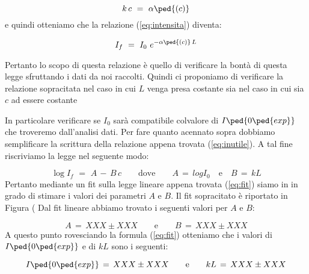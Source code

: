 \begin{equation}
	k\,c \,\,=\,\, \alpha\ped{(c)}
\end{equation}
%
e quindi otteniamo che la relazione (\ref{eq:intensita}) diventa:

\begin{equation}
	I_f \,\,=\,\, I_0 \,\, e^{-\alpha\ped{(c)}\,L}
	\label{eq:inutile}
\end{equation}
%

Pertanto lo scopo di questa relazione è quello di verificare la bontà di questa legge sfruttando i dati da noi raccolti.
Quindi ci proponiamo di verificare la relazione sopracitata nel caso in cui $L$ venga presa costante sia nel caso in cui sia $c$ ad essere costante

 In particolare verificare se $I_0$ sarà compatibile colvalore di $I\ped{0\ped{exp}}$ che troveremo dall'analisi dati.
Per fare quanto acennato sopra dobbiamo semplificare la scrittura della relazione appena trovata (\ref{eq:inutile}).
A tal fine riscriviamo la legge nel seguente modo:

\begin{equation}
	\log{I_f} \,\,=\,\, A \,-\, B \, c \qquad \text{dove} \qquad A \,=\, log{I_0} \quad \text{e} \quad B\,=\, kL
	\label{eq:fit}
\end{equation}
%
Pertanto mediante un fit sulla legge lineare appena trovata (\ref{eq:fit}) siamo in in grado di stimare i valori dei parametri
$A$ e $B$. Il fit sopracitato è riportato in Figura (%
Dal fit lineare abbiamo trovato i seguenti valori per $A$ e $B$:

\begin{equation*}
	A \,=\, XXX \pm XXX \qquad \text{e} \qquad B \,=\, XXX \pm XXX
\end{equation*}
%
A questo punto rovesciando la formula (\ref{eq:fit}) otteniamo che i valori di $I\ped{0\ped{exp}}$ e di $kL$ sono i seguenti:

\begin{equation}
	I\ped{0\ped{exp}} \,=\, XXX \pm XXX \qquad \text{e} \qquad kL \,=\, XXX \pm XXX
\end{equation}
%



